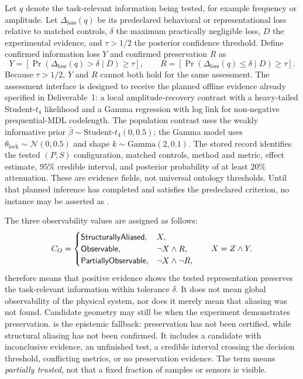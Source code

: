 Let $q$ denote the task-relevant information being tested, for example frequency or amplitude. Let $\Delta_{\mathrm{loss}}(q)$ be its predeclared behavioral or representational loss relative to matched controls, $\delta$ the maximum practically negligible loss, $D$ the experimental evidence, and $\tau>1/2$ the posterior confidence threshold. Define confirmed information loss $Y$ and confirmed preservation $R$ as
\begin{equation}
Y=\left[\Pr\!\left(\Delta_{\mathrm{loss}}(q)>\delta\mid D\right)\geq\tau\right],
\qquad
R=\left[\Pr\!\left(\Delta_{\mathrm{loss}}(q)\leq\delta\mid D\right)\geq\tau\right].
\label{eq:bayesian-evidence}
\end{equation}
Because $\tau>1/2$, $Y$ and $R$ cannot both hold for the same assessment. The assessment interface is designed to receive the planned offline evidence already specified in Deliverable~1: a local amplitude-recovery contrast with a heavy-tailed Student-$t_4$ likelihood and a Gamma regression with log link for non-negative prequential-MDL codelength. The population contrast uses the weakly informative prior $\bar\beta\sim\text{Student-}t_4(0,0.5)$; the Gamma model uses $\theta_{\mathrm{lock}}\sim\mathcal N(0,0.5)$ and shape $k\sim\mathrm{Gamma}(2,0.1)$. The stored record identifies the tested $(P,S)$ configuration, matched controls, method and metric, effect estimate, $95\%$ credible interval, and posterior probability of at least $20\%$ attenuation. These are evidence fields, not universal ontology thresholds. Until that planned inference has completed and satisfies the predeclared criterion, no instance may be asserted as .

The three observability values are assigned as follows:
\begin{equation}
C_O=
\begin{cases}
\textsf{StructurallyAliased}, & X,\\
\textsf{Observable}, & \neg X\wedge R,\\
\textsf{PartiallyObservable}, & \neg X\wedge\neg R,
\end{cases}
\qquad X=Z\wedge Y.
\label{eq:observability-state}
\end{equation}
 therefore means that positive evidence shows the tested representation preserves the task-relevant information within tolerance $\delta$. It does not mean global observability of the physical system, nor does it merely mean that aliasing was not found. Candidate geometry may still be  when the experiment demonstrates preservation.  is the epistemic fallback: preservation has not been certified, while structural aliasing has not been confirmed. It includes a candidate with inconclusive evidence, an unfinished test, a credible interval crossing the decision threshold, conflicting metrics, or no preservation evidence. The term means \emph{partially trusted}, not that a fixed fraction of samples or sensors is visible.

